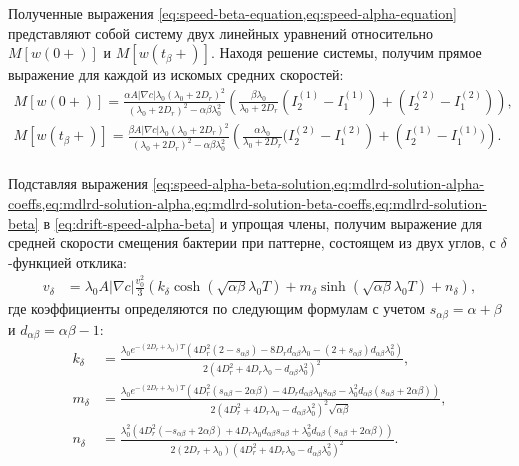 Полученные выражения \cref{eq:speed-beta-equation,eq:speed-alpha-equation} представляют собой систему двух линейных уравнений относительно $M[w(0+)]$ и $M[w(t_{\beta}+)]$. Находя решение системы, получим прямое выражение для каждой из искомых средних скоростей:
\begin{equation}
    \begin{aligned}
        M[w(0+)] = \frac{\alpha A |\nabla c|\lambda_0 (\lambda_0+2D_r)^2}{(\lambda_0+2D_r)^2-\alpha\beta\lambda_0^2} \left ( \frac{\beta \lambda_0}{\lambda_0+2D_r}\left (I_2^{(1)} - I_1^{(1)}\right ) + \left (I_2^{(2)} - I_1^{(2)}\right )\right ), \\
        M[w(t_{\beta}+)] = \frac{\beta A |\nabla c|\lambda_0 (\lambda_0+2D_r)^2}{(\lambda_0+2D_r)^2-\alpha\beta\lambda_0^2} \left ( \frac{\alpha \lambda_0}{\lambda_0+2D_r}(I_2^{(2)} - I_1^{(2)}\right ) + \left (I_2^{(1)} - I_1^{(1)})\right ). \\
        \label{eq:speed-alpha-beta-solution}
    \end{aligned}
\end{equation}

Подставляя выражения \cref{eq:speed-alpha-beta-solution,eq:mdlrd-solution-alpha-coeffs,eq:mdlrd-solution-alpha,eq:mdlrd-solution-beta-coeffs,eq:mdlrd-solution-beta} в \cref{eq:drift-speed-alpha-beta} и упрощая члены, получим выражение для средней скорости смещения бактерии при паттерне, состоящем из двух углов, с $\delta$-функцией отклика:
\begin{equation}
    \begin{aligned}
        v_{\delta}&=\lambda_0 A |\nabla c| \frac{v_0^2}{3} \left ( k_{\delta} \cosh \left (\sqrt{\alpha \beta} \lambda_0 T \right ) + m_{\delta} \sinh \left (\sqrt{\alpha \beta} \lambda_0 T \right ) + n_{\delta} \right ),
        \label{eq:mean-displacement-delta-response-solution}
    \end{aligned}
\end{equation}
где коэффициенты определяются по следующим формулам с учетом $s_{\alpha\beta}=\alpha+\beta$ и $d_{\alpha\beta}=\alpha\beta-1$:
\begin{equation}
    \begin{aligned}
        k_{\delta}&=\frac{\lambda_0 e^{-(2D_r+\lambda_0)T}\left (4D_r^2(2-s_{\alpha\beta})-8D_r d_{\alpha\beta}\lambda_0-(2+s_{\alpha\beta})d_{\alpha\beta}\lambda_0^2 \right )}{2\left (4D_r^2+4D_r\lambda_0-d_{\alpha\beta}\lambda_0^2\right )^2}, \\
        m_{\delta}&=\frac{\lambda_0 e^{-(2D_r+\lambda_0)T}\left (4D_r^2(s_{\alpha\beta}-2\alpha\beta)-4D_rd_{\alpha\beta}\lambda_0s_{\alpha\beta}-\lambda_0^2d_{\alpha\beta}(s_{\alpha\beta}+2\alpha\beta)\right )}{2\left (4D_r^2+4D_r\lambda_0-d_{\alpha\beta}\lambda_0^2\right )^2\sqrt{\alpha\beta}}, \\
        n_{\delta}&=\frac{\lambda_0^2 \left (4D_r^2(-s_{\alpha\beta}+2\alpha\beta)+4D_r\lambda_0d_{\alpha\beta}s_{\alpha\beta}+\lambda_0^2d_{\alpha\beta}(s_{\alpha\beta}+2\alpha\beta)\right )}{2(2D_r+\lambda_0)\left (4D_r^2+4D_r\lambda_0-d_{\alpha\beta}\lambda_0^2\right )^2}. \\
        \label{eq:mddrs-coeffs}
    \end{aligned}
\end{equation}

